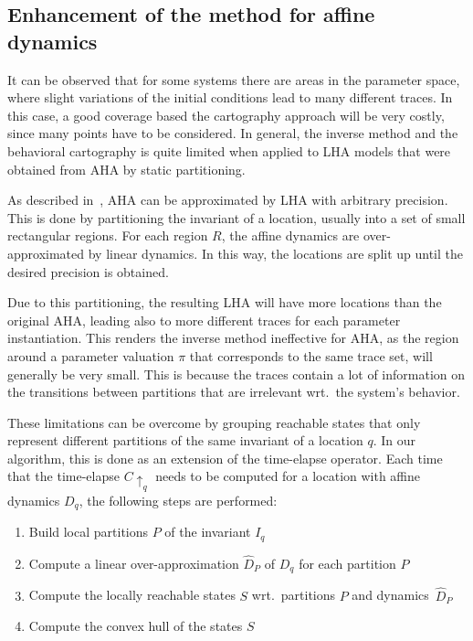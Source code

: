\documentclass{llncs}
\newcommand{\telapse}{\ensuremath{\uparrow}}
\begin{document}
\subsection{Enhancement of the method for affine dynamics}\label{sec:laha}

It can be observed that for some systems there are areas in the
parameter space, where slight variations of the initial conditions
lead to many different traces. In this case, a good coverage based the
cartography approach will be very costly, since many points have to be
considered. In general, the inverse method and the behavioral
cartography is quite limited when applied to LHA models that were
obtained from AHA by static partitioning.

As described in~\cite{Fre:2008}, AHA can be approximated by LHA with
arbitrary precision. This is done by partitioning the invariant of a
location, usually into a set of small rectangular regions. For each
region $R$, the affine dynamics are over-approximated by linear
dynamics. In this way, the locations are split up until the desired
precision is obtained.

Due to this partitioning, the resulting LHA will have more locations
than the original AHA, leading also to more different traces for each
parameter instantiation. This renders the inverse method ineffective
for AHA, as the region around a parameter valuation $\pi$ that
corresponds to the same trace set, will generally be very small. This
is because the traces contain a lot of information on the
transitions between partitions that are irrelevant
wrt.~the system's behavior.

These limitations can be overcome by grouping reachable states that only
represent different partitions of the same invariant of a location
$q$. In our algorithm, this is done as an extension of the time-elapse
operator. Each time that the time-elapse $C \telapse_{q}$ needs to be
computed for a location with affine dynamics $D_q$, the
following steps are performed:
\begin{enumerate}
\item Build local partitions $P$ of the invariant $I_q$
\item Compute a linear over-approximation $\hat{D}_P$ of $D_q$ for
  each partition $P$
\item Compute the locally reachable states $S$ wrt.~partitions
  $P$ and dynamics~$\hat{D}_P$
\item Compute the convex hull of the states $S$
\end{enumerate}
\end{document}
